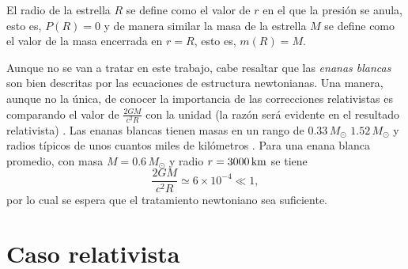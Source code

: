 El radio de la estrella $R$ se define como el valor de $r$ en el que la presión se anula, esto es, $P(R)=0$ y de manera similar la masa de la estrella $M$ se define como el valor de la masa encerrada en $r=R$, esto es, $m(R)=M$.

 Aunque no se van a tratar en este trabajo, cabe resaltar que las \emph{enanas blancas} son bien descritas por las ecuaciones de estructura newtonianas. Una manera, aunque no la única, de conocer la importancia de las correcciones relativistas es comparando el valor de $\frac{2GM}{c^2R}$ con la unidad (la razón será evidente en el resultado relativista) \cite{Weinberg1972}. Las enanas blancas tienen masas en un rango de $0.33\,M_{\odot}$ $1.52\,M_{\odot}$ y radios típicos de unos cuantos miles de kilómetros \cite{Glendenning2000}. Para una enana blanca promedio, con masa $M=0.6\,M_{\odot}$ y radio $r=3000 \,\rm{km}$ se tiene
\begin{equation}
    \frac{2GM}{c^2R}\simeq 6\times 10^{-4}\ll 1,
\end{equation}
por lo cual se espera que el tratamiento newtoniano sea suficiente. 

\section{Caso relativista}\label{CR}


